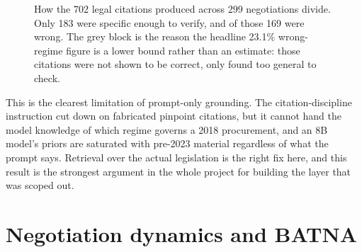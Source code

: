 \begin{figure}[htbp]
\centering
{}
\caption[Citation validity]{How the 702 legal citations produced across 299
negotiations divide. Only 183 were specific enough to verify, and of those
169 were wrong. The grey block is the reason the headline 23.1\% wrong-regime
figure is a lower bound rather than an estimate: those citations were not shown to
be correct, only found too general to check.}
\label{fig:citations}
\end{figure}

This is the clearest limitation of prompt-only grounding. The citation-discipline
instruction cut down on fabricated pinpoint citations, but it cannot hand the
model knowledge of which regime governs a 2018 procurement, and an 8B model's
priors are saturated with pre-2023 material regardless of what the prompt says.
Retrieval \citep{lewis2020rag} over the actual legislation is the right fix here, and this result is
the strongest argument in the whole project for building the layer that was
scoped out.

\section{Negotiation dynamics and BATNA}
\label{sec:dynamics}

